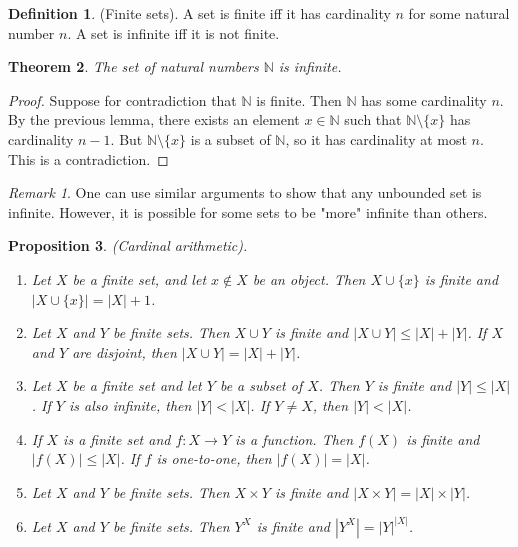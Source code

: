 \documentclass[12pt]{article}
\newtheorem{theorem}{Theorem}[section]
\newtheorem{proposition}[theorem]{Proposition}
\theoremstyle{definition}
\newtheorem{definition}[theorem]{Definition}
\theoremstyle{remark}
\newtheorem*{remark}{Remark}
\begin{document}
\begin{definition}
    (Finite sets). A set is finite iff it has cardinality $n$ for some natural number $n$. A set is infinite iff it is not finite. 
\end{definition}

\begin{theorem}
    The set of natural numbers $\mathbb{N}$ is infinite.
\end{theorem}

\begin{proof}
    Suppose for contradiction that $\mathbb{N}$ is finite. Then $\mathbb{N}$ has some cardinality $n$. By the previous lemma, there exists an element $x \in \mathbb{N}$ such that $\mathbb{N} \setminus \{x\}$ has cardinality $n-1$. But $\mathbb{N} \setminus \{x\}$ is a subset of $\mathbb{N}$, so it has cardinality at most $n$. This is a contradiction.
\end{proof}

\begin{remark}
    One can use similar arguments to show that any unbounded set is infinite. However, it is possible for some sets to be "more" infinite than others.
\end{remark}

\begin{proposition}
    (Cardinal arithmetic).
    \begin{enumerate}
        \item Let $X$ be a finite set, and let $x \not\in X$ be an object. Then $X \cup \{x\}$ is finite and $|X \cup \{x\}| = |X| + 1$.
        \item Let $X$ and $Y$ be finite sets. Then $X \cup Y$ is finite and $|X \cup Y| \leq |X| + |Y|$. If $X$ and $Y$ are disjoint, then $|X \cup Y| = |X| + |Y|$.
        \item Let $X$ be a finite set and let $Y$ be a subset of $X$. Then $Y$ is finite and $|Y| \leq |X|$. If $Y$ is also infinite, then $|Y| < |X|$. If $Y \neq X$, then $|Y| < |X|$.
        \item If $X$ is a finite set and $f \colon X \to Y$ is a function. Then $f(X)$ is finite and $|f(X)| \leq |X|$. If $f$ is one-to-one, then $|f(X)| = |X|$. 
        \item Let $X$ and $Y$ be finite sets. Then $X \times Y$ is finite and $|X \times Y| = |X| \times |Y|$.
        \item Let $X$ and $Y$ be finite sets. Then $Y^X$ is finite and $|Y^X| = |Y|^{|X|}$.
    \end{enumerate}
\end{proposition}
\end{document}
